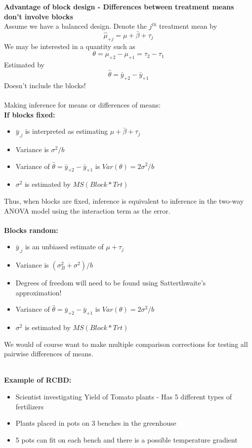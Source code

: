 \newpage

\textbf{Advantage of block design - Differences between treatment means don't involve blocks}\\
Assume we have a balanced design.  Denote the $j^{th}$ treatment mean by 
$$\hat{\mu}_{+j}=\mu+\bar{\beta}+\tau_{j}$$
We may be interested in a quantity such as 
$$\theta =\mu_{+2}-\mu_{+1}=\tau_{2}-\tau_{1}$$
Estimated by 
$$\hat{\theta} = \bar{y}_{+2}-\bar{y}_{+1}$$
Doesn't include the blocks!\\~\\

Making inference for means or differences of means:	\\	
\textbf{If blocks fixed:}
			\begin{itemize}
				\item{$\bar{y}_{.j}$ is interpreted as estimating $\mu+\bar{\beta}+\tau_{j}$}
				\item{Variance is $\sigma^{2}/b$}
				\item{Variance of $\hat{\theta}= \bar{y}_{+2}-\bar{y}_{+1}$ is $Var(\theta)=2\sigma^{2}/b$}
				\item{$\sigma^2$ is estimated by $MS(Block*Trt)$}
			\end{itemize}
Thus, when blocks are fixed, inference is equivalent to inference in the two-way ANOVA model using the interaction term as the error.\\~\\
\textbf{Blocks random:}
			\begin{itemize}
				\item{$\bar{y}_{.j}$ is an unbiased estimate of $\mu+\tau_{j}$}
				\item{Variance is $(\sigma_{B}^2+\sigma^2)/b$}
				\item{Degrees of freedom will need to be found using Satterthwaite's approximation!}
				\item{Variance of $\hat{\theta}= \bar{y}_{+2}-\bar{y}_{+1}$ is $Var(\theta)=2\sigma^{2}/b$}
				\item{$\sigma^2$ is estimated by $MS(Block*Trt)$}
			\end{itemize}

We would of course want to make multiple comparison corrections for testing all pairwise differences of means.\\~\\

\newpage

\textbf{Example of RCBD:}
    \begin{itemize}
        \item{Scientist investigating Yield of Tomato plants - Has 5 different types of fertilizers}
        \item{Plants placed in pots on 3 benches in the greenhouse}
     		\item{5 pots can fit on each bench and there is a possible temperature gradient}
    \end{itemize}

